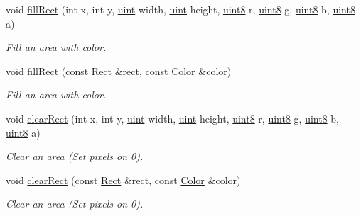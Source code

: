 \begin{DoxyCompactItemize}
void \hyperlink{class_f2_c_1_1_bitmap_af2961f38837be847f9e6a283ea90ba9b}{fillRect} (int x, int y, \hyperlink{namespace_f2_c_a58be2bac9eb3e3c99cb41b6008bf4fae}{uint} width, \hyperlink{namespace_f2_c_a58be2bac9eb3e3c99cb41b6008bf4fae}{uint} height, \hyperlink{namespace_f2_c_a711deb33697d145669b9c0c4fe87c7ca}{uint8} r, \hyperlink{namespace_f2_c_a711deb33697d145669b9c0c4fe87c7ca}{uint8} g, \hyperlink{namespace_f2_c_a711deb33697d145669b9c0c4fe87c7ca}{uint8} b, \hyperlink{namespace_f2_c_a711deb33697d145669b9c0c4fe87c7ca}{uint8} a)
\begin{DoxyCompactList}\small\item\em Fill an area with color. \item\end{DoxyCompactList}\item 
void \hyperlink{class_f2_c_1_1_bitmap_abe81c235fd6bdd3a4300a20395425039}{fillRect} (const \hyperlink{class_f2_c_1_1_rect}{Rect} \&rect, const \hyperlink{class_f2_c_1_1_color}{Color} \&color)
\begin{DoxyCompactList}\small\item\em Fill an area with color. \item\end{DoxyCompactList}\item 
void \hyperlink{class_f2_c_1_1_bitmap_a50d157cc79797d368566bc7f9e41323a}{clearRect} (int x, int y, \hyperlink{namespace_f2_c_a58be2bac9eb3e3c99cb41b6008bf4fae}{uint} width, \hyperlink{namespace_f2_c_a58be2bac9eb3e3c99cb41b6008bf4fae}{uint} height, \hyperlink{namespace_f2_c_a711deb33697d145669b9c0c4fe87c7ca}{uint8} r, \hyperlink{namespace_f2_c_a711deb33697d145669b9c0c4fe87c7ca}{uint8} g, \hyperlink{namespace_f2_c_a711deb33697d145669b9c0c4fe87c7ca}{uint8} b, \hyperlink{namespace_f2_c_a711deb33697d145669b9c0c4fe87c7ca}{uint8} a)
\begin{DoxyCompactList}\small\item\em Clear an area (Set pixels on 0). \item\end{DoxyCompactList}\item 
void \hyperlink{class_f2_c_1_1_bitmap_ab2388a8c3d0dbe0cb2b3313b53c142ca}{clearRect} (const \hyperlink{class_f2_c_1_1_rect}{Rect} \&rect, const \hyperlink{class_f2_c_1_1_color}{Color} \&color)
\begin{DoxyCompactList}\small\item\em Clear an area (Set pixels on 0). \item\end{DoxyCompactList}\item 

\end{DoxyCompactItemize}

